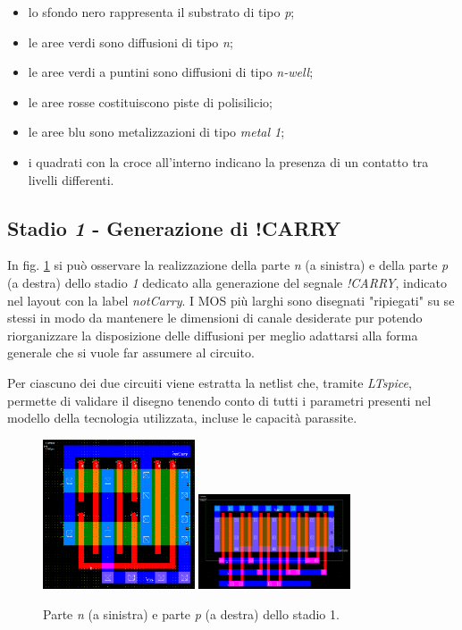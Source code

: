 \begin{itemize}
	\item lo sfondo nero rappresenta il substrato di tipo \textit{p};
	\item le aree verdi sono diffusioni di tipo \textit{n};
	\item le aree verdi a puntini sono diffusioni di tipo \textit{n-well};
	\item le aree rosse costituiscono piste di polisilicio;
	\item le aree blu sono metalizzazioni di tipo \textit{metal 1}; 
	\item i quadrati con la croce all'interno indicano la presenza di un contatto tra livelli differenti.
\end{itemize}

\subsection{Stadio \textit{1} - Generazione di !CARRY}

In fig. \ref{fig:NMOSePMOSnotCarry} si può osservare la realizzazione della parte \textit{n} (a sinistra) e della parte \textit{p} (a destra) dello stadio \textit{1} dedicato alla generazione del segnale \textit{!CARRY}, indicato nel layout con la label \textit{notCarry}. I MOS più larghi sono disegnati "ripiegati" su se stessi in modo da mantenere le dimensioni di canale desiderate pur potendo riorganizzare la disposizione delle diffusioni per meglio adattarsi alla forma generale che si vuole far assumere al circuito. 

Per ciascuno dei due circuiti viene estratta la netlist che, tramite \textit{LTspice}, permette di validare il disegno tenendo conto di tutti i parametri presenti nel modello della tecnologia utilizzata, incluse le capacità parassite.

\begin{figure}[hbt!]
	\centering
	\includegraphics[width=0.4\textwidth]{figure/Msk_NMOS_notCarry_V2.png}\hfil
	\includegraphics[width=0.4\textwidth]{figure/Msk_PMOS_notCarry_V2.png}
	\caption{Parte \textit{n} (a sinistra) e parte \textit{p} (a destra) dello stadio 1.}
	\label{fig:NMOSePMOSnotCarry}
\end{figure} 

